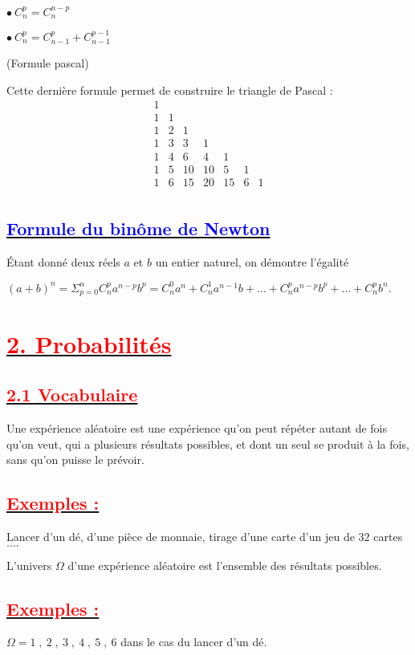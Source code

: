 \documentclass[12pt]{article}
\begin{document}
$\bullet\ C_{n}^{p}=C_{n}^{n-p}$

$\bullet\ C_{n}^{p}=C_{n-1}^{p}+C_{n-1}^{p-1}$

(Formule pascal)

Cette dernière formule permet de construire le triangle de Pascal : 
\[
\begin{array}{ccccccc}
1 \\
1 & 1 \\
1 & 2 & 1 \\
1 & 3 & 3 & 1 \\
1 & 4 & 6 & 4 & 1 \\
1 & 5 & 10 & 10 & 5 & 1 \\
1 & 6 & 15 & 20 & 15 & 6 & 1 \\
\end{array}
\]

\subsection*{\underline{\textbf{\textcolor{blue}{Formule du binôme de Newton}}}}
Étant donné deux réels $a$ et $b$ un entier naturel, on démontre l'égalité

$(a+b)^{n}=\Sigma_{p=0}^{n}C_{n}^{p}a^{n-p}b^{p}=C_{n}^{0}a^{n}+C_{n}^{1}a^{n-1}b+\ldots+C_{n}^{p}a^{n-p}b^{p}+\ldots+C_{n}^{p}b^{n}.$
\section*{\underline{\textbf{\textcolor{red}{2. Probabilités}}}}
\subsection*{\underline{\textbf{\textcolor{red}{2.1 Vocabulaire}}}}
Une expérience aléatoire est une expérience qu'on  peut répéter autant de fois qu'on veut, qui a plusieurs résultats possibles, et dont un seul se produit à la fois,  sans qu'on puisse le prévoir.
\subsection*{\underline{\textbf{\textcolor{red}{Exemples :}}}}
Lancer d'un dé, d'une pièce de monnaie, tirage d'une carte d'un jeu de $32$ cartes $\ldots.$

L'univers $\Omega$ d'une expérience aléatoire est l'ensemble des résultats possibles.
\subsection*{\underline{\textbf{\textcolor{red}{Exemples :}}}}
$\Omega={1\;,\ 2\;,\ 3\;,\ 4\;,\ 5\;,\ 6}$ dans le cas du lancer d'un dé.
\end{document}
